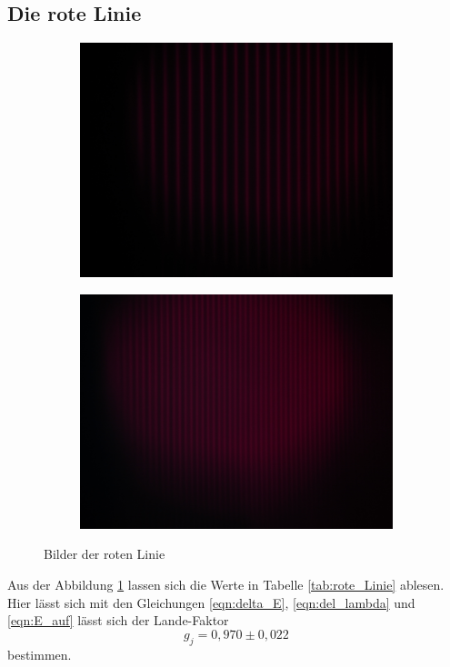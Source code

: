 \subsection{Die rote Linie}
\begin{figure}
  \centering
  \begin{subfigure}{0.4\textwidth}
    \centering
    \includegraphics[width=\textwidth]{Bilder/rot_sigma_ohne_B.JPG}
  \end{subfigure}
  \begin{subfigure}{0.4\textwidth}
    \centering
    \includegraphics[width=\textwidth]{Bilder/rot_sigma_mit_B.JPG}
  \end{subfigure}
  \caption{Bilder der roten Linie}
  \label{fig:rote_Linie}
\end{figure}
Aus der Abbildung \ref{fig:rote_Linie} lassen sich die Werte in Tabelle \ref{tab:rote_Linie} ablesen.
Hier lässt sich mit den Gleichungen \eqref{eqn:delta_E}, \eqref{eqn:del_lambda} und \eqref{eqn:E_auf} lässt sich der Lande-Faktor
\begin{equation}
  g_j = 0,970\pm 0,022
\end{equation}
bestimmen.

